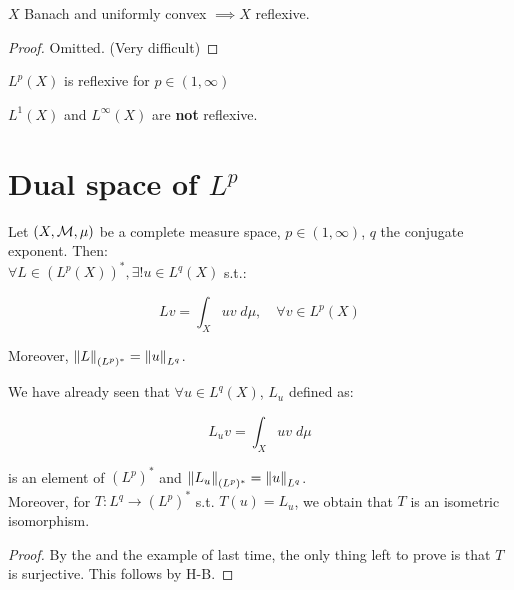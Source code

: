 \begin{ftheorem}
    $X$ Banach and uniformly convex $\implies X$ reflexive.
\end{ftheorem}

\begin{proof}
    Omitted. (Very difficult)
\end{proof}

\begin{fcorollary}
    $L^p(X)$ is reflexive for $p \in (1, \infty)$
\end{fcorollary}

\begin{fremark}
    $L^1(X)$ and $L^{\infty}(X)$ are \textbf{not} reflexive.
\end{fremark}

\section{Dual space of $L^p$}

\begin{ftheorem}
    Let $(X, \mathcal{M}, \mu)$ be a complete measure space, $p \in (1, \infty)$,
    $q$ the conjugate exponent. Then:\\
    $\forall L \in (L^p(X))^*, \exists ! u \in L^q(X)$ s.t.:
    
    $$L v = \int_X uv \; d \mu, \quad \forall v \in L^p(X)$$

    Moreover, $\left\|L\right\|_{(L^p)^*} = \left\|u\right\|_{L^q}$.

\end{ftheorem}

\begin{fremark}
    We have already seen that $\forall u \in L^q(X)$, $L_u$ defined as:

    $$L_u v = \int_X uv \; d\mu$$

    is an element of $(L^p)^*$ and $\left\|L_u\right\|_{(L^p)^*} = \left\|u\right\|_{L^q}$.\\

    Moreover, for $T: L^q \to (L^p)^*$ s.t. $T(u) = L_u$, we obtain that 
    $T$ is an isometric isomorphism.
\end{fremark}

\begin{proof}
    By the  and the example of last time,
    the only thing left to prove is that $T$ is surjective. This follows by H-B.

\end{proof}

